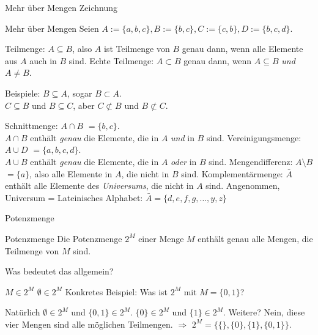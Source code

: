 \begin{frame}{Mehr über Mengen}
	Zeichnung
\end{frame}

\begin{frame}{Mehr über Mengen}
	\pause Seien $A := \{a, b, c\}, B:= \{b, c\}, C:= \{c, b\}, D := \{b, c, d\}$.
	
	\begin{itemize}
		\pitem Teilmenge\pause : $A \subseteq B$\pause , also $A$ ist Teilmenge von $B$ \pause genau dann, wenn alle Elemente aus $A$ auch in $B$ sind.
		\pitem Echte Teilmenge\pause : $A \subset B$ \pause genau dann, wenn $A \subseteq B$ \pause \emph{und} $A \neq B$.
		\begin{itemize}
			\pitem Beispiele: \pause $B \subseteq A$\pause , sogar $B \subset A$.\\ \pause $C \subseteq B$ \pause und $B \subseteq C$\pause , aber $C \not\subset B$ und $B \not\subset C$.
		\end{itemize}
		\pitem Schnittmenge\pause : $A \cap B$ \pause $ = \{b, c\}$.\pause \\ $A \cap B$ enthält \emph{genau} die Elemente, die in $A$ \emph{und} in $B$ sind.%
		\pitem Vereinigungsmenge\pause : $A \cup D$ \pause $ = \{a, b, c, d\}$.\pause \\ $A \cup B$ enthält \emph{genau} die Elemente, die in $A$ \emph{oder} in $B$ sind.
		\pitem Mengendifferenz: \pause $A \setminus B$ \pause $ = \{a\}$\pause , also alle Elemente in $A$, die nicht in $B$ sind.
		\pitem Komplementärmenge: \pause $\bar{A}$ \pause enthält alle Elemente des \emph{Universums}, die nicht in $A$ sind. \pause Angenommen, Universum = Lateinisches Alphabet: \pause $\bar{A} = \{d, e, f, g, \dots, y, z\}$
	\end{itemize}
\end{frame}

\begin{frame}{Potenzmenge}
	\pause
	
	\begin{block}{Potenzmenge}
		Die Potenzmenge \pause $2^M$ \pause einer Menge $M$ \pause enthält genau alle Mengen, die Teilmenge von $M$ sind.	
	\end{block}
	
	\pause
	
	Was bedeutet das allgemein?
	
	\begin{itemize}
		\pitem $M \in 2^M$
		\pitem $\emptyset \in 2^M$
		\pitem Konkretes Beispiel: \pause Was ist $2^M$ mit $M = \{0, 1\}$?
		\begin{itemize}
			\pitem Natürlich $\emptyset \in 2^M$ und $\{0, 1\} \in 2^M$.
			\pitem $\{0\} \in 2^M$ \pause und $\{1\} \in 2^M$.
			\pitem Weitere? \pause Nein, diese vier Mengen sind alle möglichen Teilmengen.
			\pitem $\Rightarrow$ $2^M = \{\{\}, \{0\}, \{1\}, \{0, 1\}\}$.
		\end{itemize}
	\end{itemize}
\end{frame}

